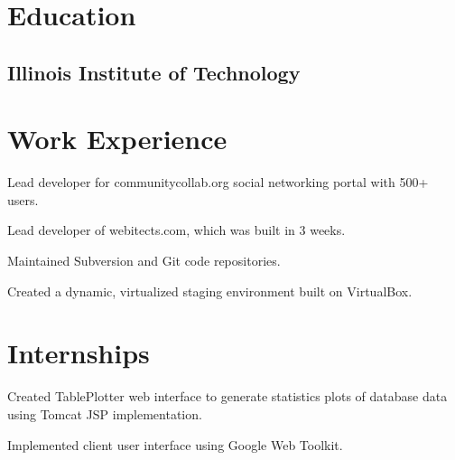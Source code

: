 \documentclass{resume}
\begin{document}
\author{Dmitry Ratnikov}
\maketitle

\section{Education}

\subsection{Illinois Institute of Technology}


\section{Work Experience}

\begin{compactitem}
  \item Lead developer for communitycollab.org social networking portal with 500+ users.
  \item Lead developer of webitects.com, which was built in 3 weeks.
  \item Maintained Subversion and Git code repositories.
  \item Created a dynamic, virtualized staging environment built on VirtualBox.
\end{compactitem}

\section{Internships}

\begin{compactitem}
  \item Created TablePlotter web interface to generate statistics plots of database data using Tomcat JSP implementation.
  \item Implemented client user interface using Google Web Toolkit.
\end{compactitem}
\end{document}
